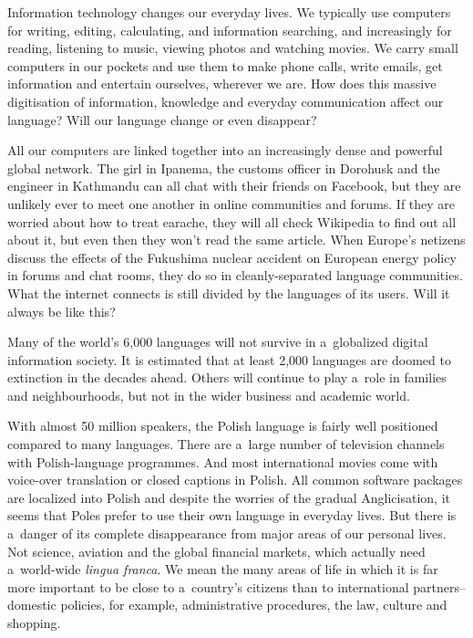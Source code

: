 \begin{multicols}{2} 

Information technology changes our everyday lives. We typically use
computers for writing, editing, calculating, and information
searching, and increasingly for reading, listening to music, viewing
photos and watching movies. We carry small computers in our pockets
and use them to make phone calls, write emails, get information and
entertain ourselves, wherever we are. How does this massive
digitisation of information, knowledge and everyday communication
affect our language? Will our language change or even disappear? 

All our computers are linked together into an increasingly dense and
powerful global network. The girl in Ipanema, the customs officer in
Dorohusk and the engineer in Kathmandu can all chat with their friends
on Facebook, but they are unlikely ever to meet one another in online
communities and forums. If they are worried about how to treat
earache, they will all check Wikipedia to find out all about it, but
even then they won’t read the same article. When Europe's netizens
discuss the effects of the Fukushima nuclear accident on European
energy policy in forums and chat rooms, they do so in
cleanly-separated language communities. What the internet connects is
still divided by the languages of its users. Will it always be like
this? 

Many of the world’s 6,000 languages will not survive in a~globalized
digital information society. It is estimated that at least 2,000
languages are doomed to extinction in the decades ahead. Others will
continue to play a~role in families and neighbourhoods, but not in the
wider business and academic world. 

With almost 50 million speakers, the Polish language is fairly well
positioned compared to many languages. There are a~large number of
television channels with Polish-language programmes. And most
international movies come with voice-over translation or closed
captions in Polish. All common software packages are localized into
Polish and despite the worries of the gradual Anglicisation, it seems
that Poles prefer to use their own language in everyday lives.
But there is a~danger of its complete disappearance from major areas
of our personal lives. Not science, aviation and the global financial
markets, which actually need a~world-wide \textit{lingua franca}. We
mean the many areas of life in which it is far more important to be
close to a~country’s citizens than to international
partners--domestic policies, for example, administrative procedures,
the law, culture and shopping. 


\end{multicols}
